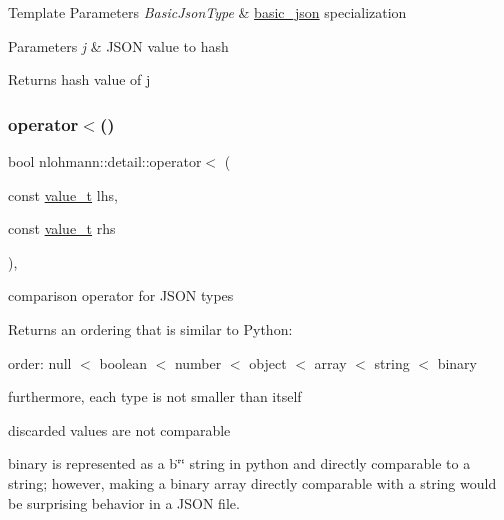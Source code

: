 \begin{DoxyTemplParams}{Template Parameters}
{\em Basic\+Json\+Type} & \hyperlink{classnlohmann_1_1basic__json}{basic\+\_\+json} specialization \\
\hline
\end{DoxyTemplParams}

\begin{DoxyParams}{Parameters}
{\em j} & J\+S\+ON value to hash \\
\hline
\end{DoxyParams}
\begin{DoxyReturn}{Returns}
hash value of j 
\end{DoxyReturn}
\mbox{\label{namespacenlohmann_1_1detail_a09169efff3bd1771fff29bd92cea19e0}} 
\subsubsection{\texorpdfstring{operator$<$()}{operator<()}}
{\footnotesize\ttfamily bool nlohmann\+::detail\+::operator$<$ (\begin{DoxyParamCaption}\item[{const \hyperlink{namespacenlohmann_1_1detail_a1ed8fc6239da25abcaf681d30ace4985}{value\+\_\+t}}]{lhs,  }\item[{const \hyperlink{namespacenlohmann_1_1detail_a1ed8fc6239da25abcaf681d30ace4985}{value\+\_\+t}}]{rhs }\end{DoxyParamCaption})\hspace{0.3cm}{\ttfamily [inline]}, {\ttfamily [noexcept]}}



comparison operator for J\+S\+ON types 

Returns an ordering that is similar to Python\+:
\begin{DoxyItemize}
\item order\+: null $<$ boolean $<$ number $<$ object $<$ array $<$ string $<$ binary
\item furthermore, each type is not smaller than itself
\item discarded values are not comparable
\item binary is represented as a b\char`\"{}\char`\"{} string in python and directly comparable to a string; however, making a binary array directly comparable with a string would be surprising behavior in a J\+S\+ON file.
\end{DoxyItemize}

